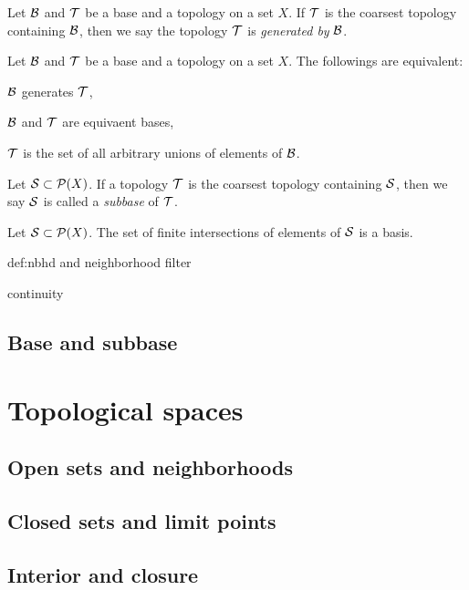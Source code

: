 \documentclass{../crs}
\begin{document}
\bigskip
\begin{defn}
Let $\mathcal{B}$ and $\mathcal{T}$ be a base and a topology on a set $X$.
If $\mathcal{T}$ is the coarsest topology containing $\mathcal{B}$, then we say the topology $\mathcal{T}$ is \emph{generated by} $\mathcal{B}$.
\end{defn}
\begin{thm}
Let $\mathcal{B}$ and $\mathcal{T}$ be a base and a topology on a set $X$.
The followings are equivalent:
\begin{cond}
\item $\mathcal{B}$ generates $\mathcal{T}$,
\item $\mathcal{B}$ and $\mathcal{T}$ are equivaent bases,
\item $\mathcal{T}$ is the set of all arbitrary unions of elements of $\mathcal{B}$.
\end{cond}
\end{thm}

\begin{defn}
Let $\mathcal{S}\subset\mathcal{P}(X)$.
If a topology $\mathcal{T}$ is the coarsest topology containing $\mathcal{S}$, then we say $\mathcal{S}$ is called a \emph{subbase} of $\mathcal{T}$.
\end{defn}
\begin{prop}
Let $\mathcal{S}\subset\mathcal{P}(X)$.
The set of finite intersections of elements of $\mathcal{S}$ is a basis.
\end{prop}






\bigskip
def:nbhd and neighborhood filter

continuity




\subsection{Base and subbase}

\section{Topological spaces}

\subsection{Open sets and neighborhoods}

\subsection{Closed sets and limit points}

\subsection{Interior and closure}
\end{document}
